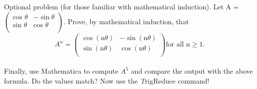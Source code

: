 \documentclass[12pt]{article}
\newenvironment{problem}[2][Problem]{\begin{trivlist}
\item[\hskip \labelsep {\bfseries #1}\hskip \labelsep {\bfseries #2.}]}{\end{trivlist}}
\begin{document}
\begin{problem}{XI}
Optional problem (for those familiar with mathematical induction). Let A = $\left(
\begin{array}{cc}
 \text{cos $\theta $} & -\sin \theta  \\
 \text{sin $\theta $} & \text{cos $\theta $} \\
\end{array}
\right)$. Prove, by mathematical induction, that \\
$$A^{n}=\left(
\begin{array}{cc}
 \cos \left( \text{n$\theta $}\right) & - \sin \left(\text{n$\theta $}\right)  \\
  \sin \left(\text{n$\theta $}\right)  & \cos  \left(\text{n$\theta $}\right) \\
\end{array}
\right)\text{for all n}\geq 1.$$\\
Finally, use Mathematica to compute $A^{5}$ and compare the output with the above formula. Do the values match? Now use the {\emph TrigReduce} command!
\end{problem}
\end{document}
